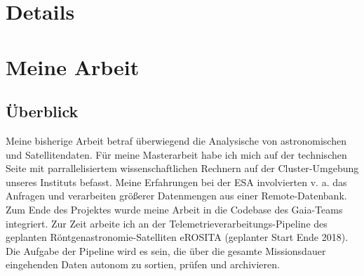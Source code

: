 \documentclass[letterpaper]{twentysecondcv} %
\begin{document}
\begin{twentyshort} %
\end{twentyshort}



\section{Details}

\begin{twentyshort} %
\end{twentyshort}

\section{Meine Arbeit}

\subsection{Überblick}

Meine bisherige Arbeit betraf überwiegend die Analysische von astronomischen und Satellitendaten. Für meine Masterarbeit
habe ich mich auf der technischen Seite mit parrallelisiertem wissenschaftlichen Rechnern auf der Cluster-Umgebung
unseres Instituts befasst.
Meine Erfahrungen bei der ESA involvierten v. a. das Anfragen und verarbeiten größerer
Datenmengen aus einer Remote-Datenbank. Zum Ende des Projektes wurde meine Arbeit in die Codebase des Gaia-Teams
integriert.
Zur Zeit arbeite ich an der Telemetrieverarbeitungs-Pipeline des geplanten Röntgen\-astronomie-Satelliten eROSITA
(geplanter Start Ende 2018). Die Aufgabe der Pipeline wird es sein, die über die gesamte Missionsdauer eingehenden
Daten autonom zu sortien, prüfen und archivieren.
\end{document}

